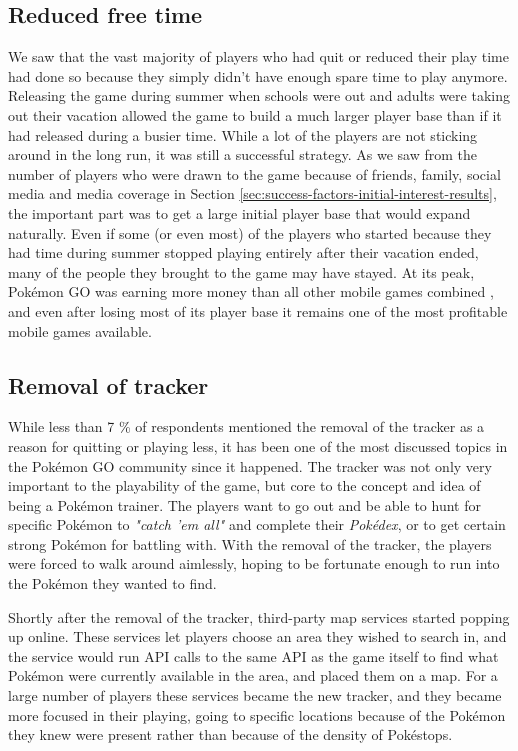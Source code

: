 \subsection{Reduced free time}
\label{sec:reduced-free-time}
We saw that the vast majority of players who had quit or reduced their play time had done so because they simply didn't have enough spare time to play anymore. Releasing the game during summer when schools were out and adults were taking out their vacation allowed the game to build a much larger player base than if it had released during a busier time. While a lot of the players are not sticking around in the long run, it was still a successful strategy. As we saw from the number of players who were drawn to the game because of friends, family, social media and media coverage in Section \ref{sec:success-factors-initial-interest-results}, the important part was to get a large initial player base that would expand naturally. Even if some (or even most) of the players who started because they had time during summer stopped playing entirely after their vacation ended, many of the people they brought to the game may have stayed. At its peak, Pokémon GO was earning more money than all other mobile games combined , and even after losing most of its player base it remains one of the most profitable mobile games available.

\subsection{Removal of tracker}
While less than 7 \% of respondents mentioned the removal of the tracker as a reason for quitting or playing less, it has been one of the most discussed topics in the Pokémon GO community since it happened. The tracker was not only very important to the playability of the game, but core to the concept and idea of being a Pokémon trainer. The players want to go out and be able to hunt for specific Pokémon to \emph{"catch 'em all"} and complete their \emph{Pokédex}, or to get certain strong Pokémon for battling with. With the removal of the tracker, the players were forced to walk around aimlessly, hoping to be fortunate enough to run into the Pokémon they wanted to find.

Shortly after the removal of the tracker, third-party map services started popping up online. These services let players choose an area they wished to search in, and the service would run API calls to the same API as the game itself to find what Pokémon were currently available in the area, and placed them on a map. For a large number of players these services became the new tracker, and they became more focused in their playing, going to specific locations because of the Pokémon they knew were present rather than because of the density of Pokéstops.


